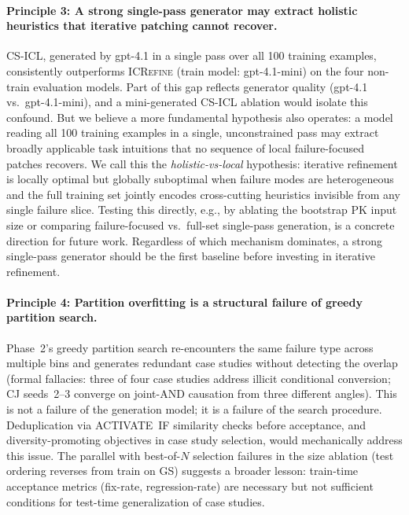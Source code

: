\documentclass{article}
\begin{document}
\paragraph{Principle 3: A strong single-pass generator may extract holistic heuristics that
iterative patching cannot recover.}
CS-ICL, generated by gpt-4.1 in a single pass over all 100 training examples, consistently
outperforms \textsc{ICRefine} (train model: gpt-4.1-mini) on the four non-train evaluation
models.
Part of this gap reflects generator quality (gpt-4.1 vs.\ gpt-4.1-mini), and a mini-generated
CS-ICL ablation would isolate this confound.
But we believe a more fundamental hypothesis also operates: a model reading all 100 training
examples in a single, unconstrained pass may extract broadly applicable task intuitions that
no sequence of local failure-focused patches recovers.
We call this the \emph{holistic-vs-local} hypothesis: iterative refinement is locally optimal
but globally suboptimal when failure modes are heterogeneous and the full training set jointly
encodes cross-cutting heuristics invisible from any single failure slice.
Testing this directly, e.g., by ablating the bootstrap PK input size or comparing
failure-focused vs.\ full-set single-pass generation, is a concrete direction for future work.
Regardless of which mechanism dominates, a strong single-pass generator should be the
first baseline before investing in iterative refinement.

\paragraph{Principle 4: Partition overfitting is a structural failure of greedy partition search.}
Phase~2's greedy partition search re-encounters the same failure type across multiple bins
and generates redundant case studies without detecting the overlap (formal fallacies: three
of four case studies address illicit conditional conversion; CJ seeds~2--3 converge on
joint-AND causation from three different angles).
This is not a failure of the generation model; it is a failure of the search procedure.
Deduplication via ACTIVATE~IF similarity checks before acceptance, and diversity-promoting
objectives in case study selection, would mechanically address this issue.
The parallel with best-of-$N$ selection failures in the size ablation (test ordering
reverses from train on GS) suggests a broader lesson: train-time acceptance metrics
(fix-rate, regression-rate) are necessary but not sufficient conditions for test-time
generalization of case studies.
\end{document}
